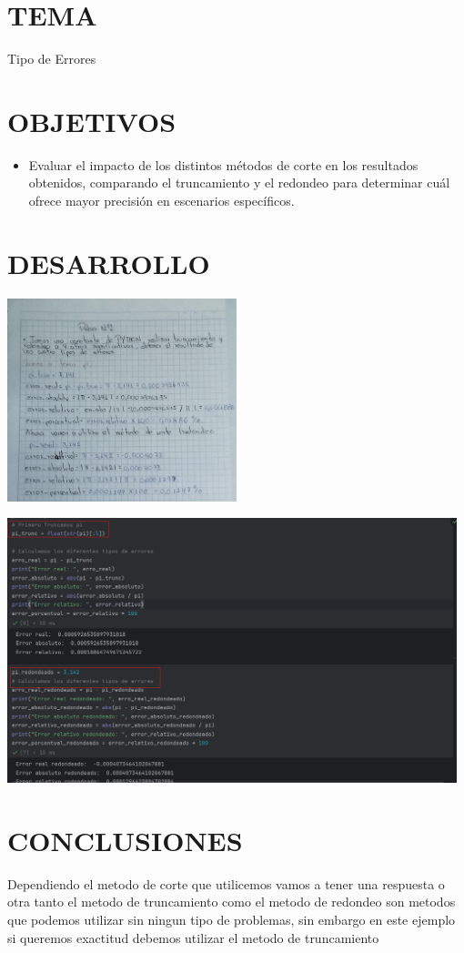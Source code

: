\documentclass[12pt]{article}
\begin{document}
\section*{TEMA}
Tipo de Errores


\section*{OBJETIVOS}
\begin{itemize}
    \item Evaluar el impacto de los distintos métodos de corte en los resultados obtenidos, comparando el truncamiento y el redondeo para determinar cuál ofrece mayor precisión en escenarios específicos.
\end{itemize}

\section*{DESARROLLO}

\includegraphics[width=0.50\textwidth]{inFiles/Figures/ConstanteError.jpg}

\vspace{0.25cm}

\includegraphics[width=0.98\textwidth]{inFiles/Figures/PythonError.png}

\vspace{0.5cm}
\section*{CONCLUSIONES}
     Dependiendo el metodo de corte que utilicemos vamos a tener una respuesta o otra tanto el metodo de truncamiento
    como el metodo de redondeo son metodos que podemos utilizar sin ningun tipo de problemas, sin embargo en este ejemplo
    si queremos exactitud debemos utilizar el metodo de truncamiento
\end{document}
